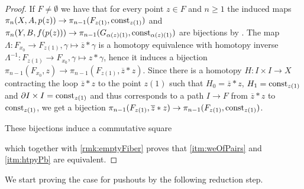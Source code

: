 \begin{lemma}
\begin{proof}
        If $F\neq\emptyset$ we have that for every point $z\in F$ and $n\geq 1$ the induced maps $\pi_n(X,A,p(z))\to \pi_{n-1}(F_{z(1)},\operatorname{const}_{z(1)})$ and $\pi_n(Y,B,f(p(z)))\to \pi_{n-1}(G_{\alpha(z)(1)},\operatorname{const}_{\alpha(z)(1)})$ are bijections by \cite[Theorem 5.1.8]{lectures_htpy_thy}.
        The map $\Lambda\colon F_{x_0}\to F_{z(1)}, \gamma\mapsto \overline{z}*\gamma$ is a homotopy equivalence with homotopy inverse $\Lambda^{-1}\colon F_{z(1)}\to F_{x_0}, \gamma\mapsto z*\gamma$, hence it induces a bijection $\pi_{n-1}(F_{x_0},z)\to\pi_{n-1}(F_{z(1)},\overline{z}*z)$.
        Since there is a homotopy $H\colon I\times I\to X$ contracting the loop $\overline{z}*z$ to the point $z(1)$ such that $H_0=\overline{z}*z$, $H_1=\operatorname{const}_{z(1)}$ and $\partial I\times I=\operatorname{const}_{z(1)}$ and thus corresponds to a path $I\to F$ from $\overline{z}*z$ to $\operatorname{const}_{z(1)}$, we get a bijection $\pi_{n-1}(F_{z(1)},\overline{z}*z)\to\pi_{n-1}(F_{z(1)},\operatorname{const}_{z(1)})$.
        
        These bijections induce a commutative square
        \begin{center} 
        \end{center}
        which together with \cref{rmk:emptyFiber} proves that \ref{itm:weOfPairs} and \ref{itm:htpyPb} are equivalent.
    \end{proof}
\end{lemma}
We start proving the case for pushouts by the following reduction step. 
